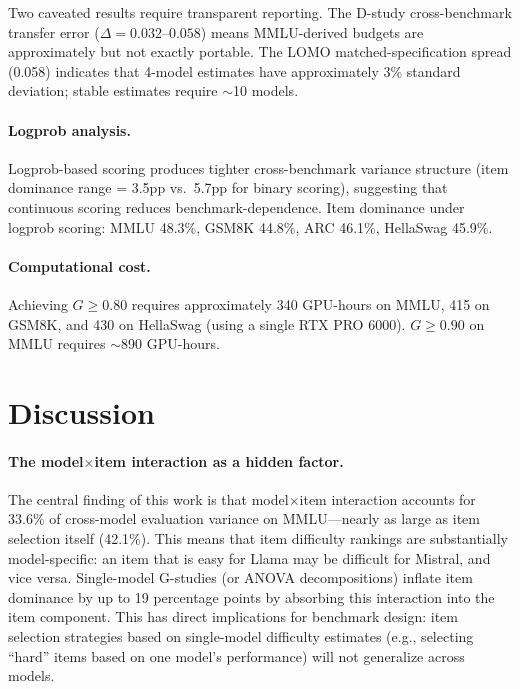 \documentclass[letterpaper]{article}
\begin{document}
Two caveated results require transparent reporting.
The D-study cross-benchmark transfer error ($\Delta = 0.032$--$0.058$) means MMLU-derived budgets are approximately but not exactly portable.
The LOMO matched-specification spread (0.058) indicates that 4-model estimates have approximately 3\% standard deviation; stable estimates require $\sim$10 models.

\paragraph{Logprob analysis.}
Logprob-based scoring produces tighter cross-benchmark variance structure (item dominance range = 3.5pp vs.\ 5.7pp for binary scoring), suggesting that continuous scoring reduces benchmark-dependence.
Item dominance under logprob scoring: MMLU 48.3\%, GSM8K 44.8\%, ARC 46.1\%, HellaSwag 45.9\%.

\paragraph{Computational cost.}
Achieving $G \geq 0.80$ requires approximately 340 GPU-hours on MMLU, 415 on GSM8K, and 430 on HellaSwag (using a single RTX PRO 6000).
$G \geq 0.90$ on MMLU requires $\sim$890 GPU-hours.

\section{Discussion}

\paragraph{The model$\times$item interaction as a hidden factor.}
The central finding of this work is that model$\times$item interaction accounts for 33.6\% of cross-model evaluation variance on MMLU---nearly as large as item selection itself (42.1\%).
This means that item difficulty rankings are substantially model-specific: an item that is easy for Llama may be difficult for Mistral, and vice versa.
Single-model G-studies (or ANOVA decompositions) inflate item dominance by up to 19 percentage points by absorbing this interaction into the item component.
This has direct implications for benchmark design: item selection strategies based on single-model difficulty estimates (e.g., selecting ``hard'' items based on one model's performance) will not generalize across models.
\end{document}
